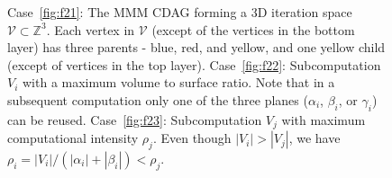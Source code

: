 \documentclass[sigplan,review,anonymous,10pt]{acmart}\settopmatter{printfolios=true,printccs=false,printacmref=false}
\begin{document}
\begin{figure}
	\centering
	\hfill
	\hfill
	\vspace{-1em}
		\caption{
			Case~\ref{fig:f21}:
		The MMM CDAG forming a 3D 
		iteration 
		space $\mathcal{V} \subset \mathbb{Z}^3$.
		Each 
		vertex 
		in $\mathcal{V}$
		(except of the vertices in the bottom layer) has 
		three parents - blue, 
		red, 
		and yellow, and one yellow child (except of vertices 
		in the top layer). 
		Case~\ref{fig:f22}: 
		Subcomputation $V_i$ with a maximum volume to surface ratio. Note that 
		in 
		a subsequent computation only one of the three planes 
		($\alpha_i$, $\beta_i$, or $\gamma_i$) 
		can 
		be reused. 
		Case~\ref{fig:f23}: Subcomputation $V_j$ with maximum computational 
		intensity $\rho_j$. Even though 
		$|V_i| > |V_j|$, we have
		$\rho_i = |V_i|/(|\alpha_i| + |\beta_i|) < \rho_j$.
	}
	\vspace{-1em}

\end{figure}
\end{document}

